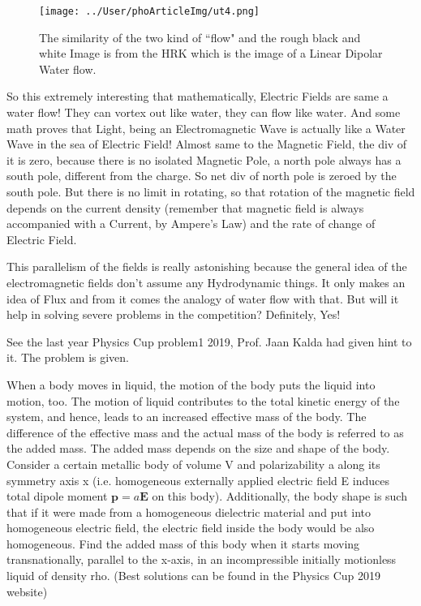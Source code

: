 \documentclass[11pt,a4paper,twocolumn,openright]{article}
\renewcommand{\vec}[1]{\boldsymbol{#1}}
\theoremstyle{definition}
\theoremstyle{definition}
\theoremstyle{definition}
\theoremstyle{definition}
\begin{document}
	
	\begin{figure}[hbtp]
	\centering
	\texttt{[image: ../User/phoArticleImg/ut4.png]}
	\caption{The similarity of the two kind of ``flow" and the rough black and white Image is from the HRK which is the image of a Linear Dipolar Water flow.	}
	\end{figure}
	
	
	
	So this extremely interesting that mathematically, Electric Fields are same a water flow! They can vortex out like water, they can flow like water. And some math proves that Light, being an Electromagnetic Wave is actually like a Water Wave in the sea of Electric Field! Almost same to the Magnetic Field, the div of it is zero, because there is no isolated Magnetic Pole, a north pole always has a south pole, different from the charge.  So net div of north pole is zeroed by the south pole. But there is no limit in rotating, so that rotation of the magnetic field depends on the current density (remember that magnetic field is always accompanied with a Current, by Ampere's Law) and the rate of change of Electric Field.  
	
	
 	This parallelism of the fields is really astonishing because the general idea of the electromagnetic fields don't assume any Hydrodynamic things. It only makes an idea of Flux and from it comes the analogy of water flow with that. But will it help in solving severe problems in the competition? Definitely, Yes!
 	
 	
	See the last year Physics Cup problem1 2019, Prof. Jaan Kalda had given hint to it. The problem is given.
	
	
{\sffamily When a body moves in liquid, the motion of the body puts the liquid into motion, too. The motion of liquid contributes to the total kinetic energy of the system, and hence, leads to an increased effective mass of the body. The difference of the effective mass and the actual mass of the body is referred to as the added mass. The added mass depends on the size and shape of the body. Consider a certain metallic body of volume V and polarizability a along its symmetry axis x (i.e. homogeneous externally applied electric field E induces total dipole moment $\vec{p} = a\vec{E}$ on this body). Additionally, the body shape is such that if it were made from a homogeneous dielectric material and put into homogeneous electric field, the electric field inside the body would be also homogeneous. Find the added mass of this body when it starts moving transnationally, parallel to the x-axis, in an incompressible initially motionless liquid of density rho. (Best solutions can be found in the Physics Cup 2019 website)}
\end{document}
